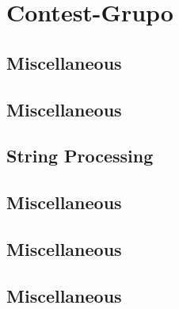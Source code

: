 \section{Contest-Grupo}
\subsection{Miscellaneous}
\raggedbottom
\vspace{-.7\baselineskip}\hrulefill
\vspace{0.1\baselineskip}\subsection{Miscellaneous}
\raggedbottom
\vspace{-.7\baselineskip}\hrulefill
\vspace{0.1\baselineskip}\subsection{String Processing}
\raggedbottom
\vspace{-.7\baselineskip}\hrulefill
\vspace{0.1\baselineskip}\subsection{Miscellaneous}
\raggedbottom
\vspace{-.7\baselineskip}\hrulefill
\vspace{0.1\baselineskip}\subsection{Miscellaneous}
\raggedbottom
\vspace{-.7\baselineskip}\hrulefill
\vspace{0.1\baselineskip}\subsection{Miscellaneous}
\raggedbottom
\vspace{-.7\baselineskip}\hrulefill
\vspace{0.1\baselineskip}
